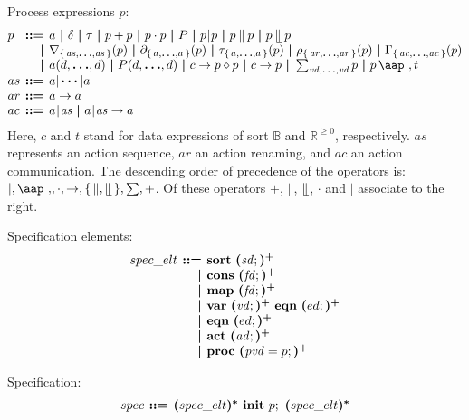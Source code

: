 \documentclass[a4paper,fleqn]{article}
\makeatletter
\newenvironment{tightarray}[1]
  {\setlength{\arraycolsep}{2pt}%
   \begin{array}{@{}#1@{}}%
  }
  {\end{array}%
  }
\newcommand{\f}[1]{\ensuremath{\mathit{#1}}}
\newcommand{\set}[1]{\ensuremath{\{\,#1\,\}}}
\newcommand{\bool}{\ensuremath{\mathbb{B}}}
\newcommand{\nnreal}{\ensuremath{\mathbb{R}^{\geq 0}}}
\newcommand{\seq}{\mathbin{\cdot}}
\newcommand{\alt}{\mathbin{+}}
\newcommand{\pmerge}{\mathbin{\parallel}}
\newcommand{\lmerge}{\mathbin{\llfloor}}
\newcommand{\sync}{\mathbin{\!\mid\!}}
\newcommand{\block}[1]{\partial_{#1}}
\newcommand{\hide}[1]{\tau_{#1}}
\newcommand{\ren}[1]{\rho_{#1}}
\newcommand{\allow}[1]{\nabla_{#1}}
\newcommand{\comm}[1]{\Gamma_{#1}}
\newcommand{\at}[1]{\mbox{\aap ,} #1}
\newcommand{\mb}[1]{\text{\boldmath$#1$}}%
\newlength{\tlength}
\newcommand{\kwsort}{{\bf sort}}
\newcommand{\kwcons}{{\bf cons}}
\newcommand{\kwmap}{{\bf map}}
\newcommand{\kwvar}{{\bf var}}
\newcommand{\kweqn}{{\bf eqn}}
\newcommand{\kwact}{{\bf act}}
\newcommand{\kwproc}{{\bf proc}}
\newcommand{\kwinit}{{\bf init}}
\makeatother
\begin{document}
Process expressions $p$:
\[\begin{tightarray}{lrl}
p   & \mb{::=} & a\ \mb{|}\ \delta\ \mb{|}\ \tau\ \mb{|}\ p \alt p\ \mb{|}\ p \seq p\ \mb{|}\ P\ \mb{|}\ 
            p \sync p\ \mb{|}\ p \pmerge p\ \mb{|}\ p \lmerge p\\
    & \mb{|} & \allow{\set{\f{as},\mb{\ldots},\f{as}}}(p)\ \mb{|}\ 
            \block{\set{a,\mb{\ldots},a}}(p)\ \mb{|}\ 
            \hide{\set{a,\mb{\ldots},a}}(p)\ \mb{|}\ 
            \ren{\set{\f{ar},\mb{\ldots},\f{ar}}}(p)\ \mb{|}\ 
            \comm{\set{\f{ac},\mb{\ldots},\f{ac}}}(p)\\
    & \mb{|} & a(d, \mb{\ldots}, d)\ \mb{|}\ 
            P(d, \mb{\ldots}, d)\ \mb{|}\ 
            c \to p \diamond p\ \mb{|}\ 
            c \to p\ \mb{|}\  
            \sum_{\f{vd},\mb{\ldots},\f{vd}}p\ \mb{|}\ 
            p\,\at\,t\\ 
as  & \mb{::=} & a |\,\mb{\cdots} | a\\
ar  & \mb{::=} & a \to a\\
ac  & \mb{::=} & a\sync\f{as}\ \mb{|}\ a\sync\f{as} \to a\\
\end{tightarray}\]
Here, $c$ and $t$ stand for data expressions of sort $\bool$ and $\nnreal$,
respectively. $\f{as}$ represents an action sequence, $\f{ar}$ an action
renaming, and $\f{ac}$ an action communication. The descending order of
precedence of the operators is: $\mid, \at, \seq, \to,
\set{\pmerge,\lmerge},\sum,\alt$. Of these operators $\alt$, $\pmerge$,
$\lmerge$, $\seq$ and $\mid$ associate to the right.

Specification elements:
\[\begin{tightarray}{lrl}
spec\_elt
& \mb{::=} & \kwsort\ \mb{(}\f{sd};\mb{)^{+}}\\
& \mb{|}   & \kwcons\ \mb{(}\f{fd};\mb{)^{+}}\\
& \mb{|}   & \kwmap\  \mb{(}\f{fd};\mb{)^{+}}\\
& \mb{|}   & \kwvar\  \mb{(}\f{vd};\mb{)^{+}}\ \kweqn\ \mb{(}ed;\mb{)^{+}}\\
& \mb{|}   & \kweqn\  \mb{(}ed;\mb{)^{+}}\\
& \mb{|}   & \kwact\  \mb{(}\f{ad};\mb{)^{+}}\\
& \mb{|}   & \kwproc\ \mb{(}\f{pvd} = p;\mb{)^{+}}\\
\end{tightarray}\]

Specification:
\[\begin{tightarray}{lrl}
spec & \mb{::=} & \mb{(}spec\_elt\mb{)^{*}}\ \kwinit\ p;\ \mb{(}spec\_elt\mb{)^{*}} 
\end{tightarray}\]
\end{document}

